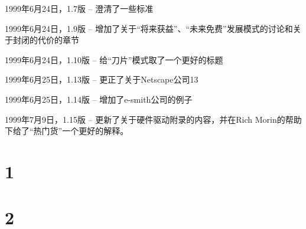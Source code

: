 \documentclass[a4paper,12pt,UTF8,twoside]{ctexbook}
\begin{document}
1999年6月24日，1.7版 -- 澄清了一些标准

1999年6月24日，1.9版 -- 增加了关于“将来获益”、“未来免费”发展模式的讨论和关于封闭的代价的章节

1999年6月24日，1.10版 -- 给“刀片”模式取了一个更好的标题

1999年6月25日，1.13版 -- 更正了关于Netscape公司13%

1999年6月25日，1.14版 -- 增加了e-smith公司的例子

1999年7月9日，1.15版 -- 更新了关于硬件驱动附录的内容，并在Rich Morin的帮助下给了“热门货”一个更好的解释。


\section{1}
\section{2}

\backmatter
\end{document}
